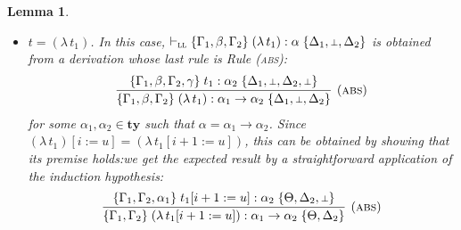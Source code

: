 \documentclass[submission,creativecommons]{eptcs}
\newtheorem{lemma}{Lemma}
\newcommand{\mybox}{\raisebox{3.5pt}{\framebox[7pt]{\rule{0mm}{0.3pt}}}}
\def\qed{\ifmmode\mybox\else{\unskip\nobreak\hfil
\penalty50\hskip1em\null\nobreak\hfil\mybox
\parfillskip=0pt\finalhyphendemerits=0\endgraf}\fi}
\newenvironment{proof}{%

\vspace{.7ex}
\noindent{\it Proof.} \rm}{\qed}
\newcommand{\bt}{{\scriptstyle\bot}}
\newcommand{\iabs}[1]{(\lambda\,#1)}
\newcommand{\iapp}[2]{(#1\,#2)}
\newcommand{\sbstt}[3]{#1[#2 := #3]}
\newcommand{\tytm}[4]{\{#1\}\;#2:#3\;\{#4\}}
\newcommand{\der}[1]{\vdash_{#1}}
\newcommand{\Sll}{{\textsc{ll}}}
\newcommand{\ty}{\mathord{\mathbf{ty}}}
\newcommand{\fenv}{\mathord{\mathbf{fenv}}}
\newcommand{\occ}[2]{\mathord{\mathrm{occ}}(#1,#2)}
\begin{document}
\begin{lemma}
\begin{proof}
\begin{itemize}
\begin{itemize}
\item $\occ{i}{t_1} = 0$ and $\occ{i}{t_2} = 1$.\quad
In this second case, $\der{\Sll}{\tytm{\Gamma_1, \beta, \Gamma_2}{\iapp{t_1}{t_2}}{\alpha}{\Delta_1, \bt, \Delta_2}}$ is
obtained by a derivation whose last rule is as follows:
\begin{align}\label{der:app2}
\infer[\mbox{(\textsc{app})}]{
\tytm{\Gamma_1, \beta, \Gamma_2}{\iapp{t_1}{t_2}}{\alpha}{\Delta_1, \bt, \Delta_2}
}{
\tytm{\Gamma_1, \beta, \Gamma_2}{t_1}{\gamma \rightarrow \alpha}{\Xi_1, \beta, \Xi_2}
&
\tytm{\Xi_1, \beta, \Xi_2}{t_2}{\gamma}{\Delta_1, \bt, \Delta_2}
}
\end{align}
for some $\gamma\in\ty$ and some $\Xi_1, \Xi_2\in\fenv$ such that $|\Xi_2|=i$.
On the one hand, by applying Lemma~\ref{lemma:l3} to the first premise of \ref{der:app2}, we have that
$\der{\Sll}{\tytm{\Gamma_1, \Gamma_2}{\sbstt{t_1}{i}{u}}{\gamma \rightarrow \alpha}{\Xi_1, \Xi_2}}$.
On the other hand, by applying the induction hypothesis to the second premise of \ref{der:app2}, we obtain
$\der{\Sll}{\tytm{\Xi_1, \Xi_2}{\sbstt{t_2}{i}{u}}{\gamma}{\Theta, \Delta_2}}$. Then, the expected result follows from these
two judgements by an application of Rule (\textsc{app}).
  
\end{itemize}

                                
\item $t = \iabs{t_1}$.\quad
In this case, $\der{\Sll}\tytm{\Gamma_1, \beta, \Gamma_2}{\iabs{t_1}}{\alpha}{\Delta_1, \bt, \Delta_2}$ is obtained
from a derivation whose last rule is Rule (\textsc{abs}):
\begin{align*}
\infer[\mbox{(\textsc{abs})}]{
\tytm{\Gamma_1, \beta, \Gamma_2}{\iabs{t_1}}{\alpha_1 \rightarrow \alpha_2}{\Delta_1, \bt, \Delta_2}
}{
\tytm{\Gamma_1, \beta, \Gamma_2, \gamma}{t_1}{\alpha_2}{\Delta_1, \bt, \Delta_2, \bt}
}
\end{align*}
for some $\alpha_1, \alpha_2 \in \ty$ such that $\alpha = \alpha_1 \rightarrow \alpha_2$.
Since $\sbstt{\iabs{t_1}}{i}{u} = \iabs{\sbstt{t_1}{i + 1}{u}}$, this can be obtained by showing that its premise holds:we get the
expected result by a straightforward application of the induction hypothesis:
\begin{align*}
\infer[\mbox{(\textsc{abs})}]{
\tytm{\Gamma_1, \Gamma_2}{\iabs{\sbstt{t_1}{i + 1}{u}}}{\alpha_1 \rightarrow \alpha_2}{\Theta, \Delta_2}
}{
\tytm{\Gamma_1, \Gamma_2, \alpha_1}{\sbstt{t_1}{i + 1}{u}}{\alpha_2}{\Theta, \Delta_2, \bt}
}
\end{align*}
\end{itemize}
\end{proof}
\end{lemma}
\end{document}
